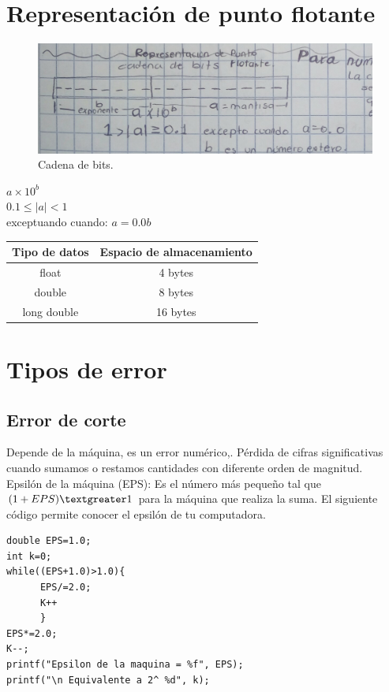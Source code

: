 \section{Representaci\'on de punto flotante}


\begin{figure}[h]
\includegraphics[scale=.16]{cadena-de-bits}
\centering
\caption{Cadena de bits.}
\end{figure}

\begin{center}
$a \times 10^b$\\
$0.1 \leq |a| < 1$\\
exceptuando cuando: $a=0.0b$ \\ 
\bigskip
\begin{tabular}{| c | c |}
\hline
Tipo de datos & Espacio de almacenamiento\\
\hline 
float& 4 bytes\\
double & 8 bytes\\
long double & 16 bytes\\
\hline
\end{tabular}
\end{center}

\section{Tipos de error}

\subsection{Error de corte}
Depende de la m\'aquina, es un error num\'erico,. P\'erdida de cifras significativas cuando sumamos o restamos cantidades con diferente orden de magnitud.\\

Epsil\'on de la m\'aquina (EPS): Es el n\'umero m\'as pequeño tal que $(1+EPS)\textgreater1$ para la m\'aquina que realiza la suma.
El siguiente c\'odigo permite conocer el epsil\'on de tu computadora.
\medskip
\begin{verbatim}
double EPS=1.0;
int k=0;
while((EPS+1.0)>1.0){
      EPS/=2.0;
      K++
      }
EPS*=2.0;
K--;
printf("Epsilon de la maquina = %f", EPS);
printf("\n Equivalente a 2^ %d", k);
\end{verbatim}

